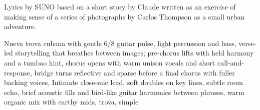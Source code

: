 
\begin{notes}
Lyrics by SUNO based on a short story by Claude written as an exercise of making sense of a series of photographs by Carlos Thompson as a small urban adventure.
\end{notes}
\begin{style}
Nueva trova cubana with gentle 6/8 guitar pulse, light percussion and bass, verse-led storytelling that breathes between images; pre-chorus lifts with held harmony and a tumbao hint, chorus opens with warm unison vocals and short call-and-response, bridge turns reflective and sparse before a final chorus with fuller backing voices, Intimate close-mic lead, soft doubles on key lines, subtle room echo, brief acoustic fills and bird-like guitar harmonics between phrases, warm organic mix with earthy mids, trova, simple
\end{style}
